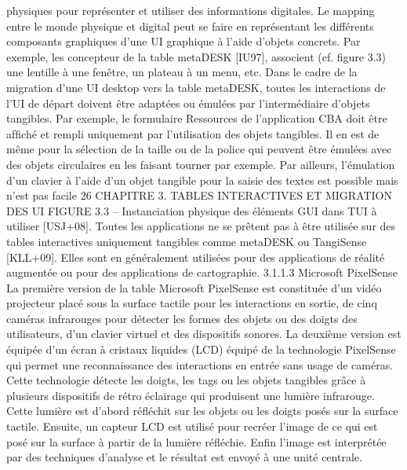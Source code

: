 \documentclass{article}
\begin{document}
physiques pour repr\'{e}senter et utiliser des informations digitales. Le mapping entre le monde physique
et digital peut se faire en repr\'{e}sentant les diff\'{e}rents composants graphiques d’une UI graphique \`{a}
l’aide d’objets concrets. Par exemple, les concepteur de la table metaDESK [IU97], associent (cf.
ﬁgure 3.3) une lentille \`{a} une fen\^{e}tre, un plateau \`{a} un menu, etc.
Dans le cadre de la migration d’une UI desktop vers la table metaDESK, toutes les interactions de
l’UI de d\'{e}part doivent \^{e}tre adapt\'{e}es ou \'{e}mul\'{e}es par l’interm\'{e}diaire d’objets tangibles. Par exemple,
le formulaire Ressources de l’application CBA doit \^{e}tre afﬁch\'{e} et rempli uniquement par l’utilisation des objets tangibles. Il en est de m\^{e}me pour la s\'{e}lection de la taille ou de la police qui peuvent
\^{e}tre \'{e}mul\'{e}es avec des objets circulaires en les faisant tourner par exemple. Par ailleurs, l’\'{e}mulation
d’un clavier \`{a} l’aide d’un objet tangible pour la saisie des textes est possible mais n’est pas facile
26
CHAPITRE 3. TABLES INTERACTIVES ET MIGRATION DES UI
FIGURE 3.3 – Instanciation physique des \'{e}l\'{e}ments GUI dans TUI
\`{a} utiliser [USJ+08]. Toutes les applications ne se pr\^{e}tent pas \`{a} \^{e}tre utilis\'{e}e sur des tables interactives uniquement tangibles comme metaDESK ou TangiSense [KLL+09]. Elles sont en g\'{e}n\'{e}ralement
utilis\'{e}es pour des applications de r\'{e}alit\'{e} augment\'{e}e ou pour des applications de cartographie.
3.1.1.3
Microsoft PixelSense
La premi\`{e}re version de la table Microsoft PixelSense est constitu\'{e}e d’un vid\'{e}o projecteur plac\'{e}
sous la surface tactile pour les interactions en sortie, de cinq cam\'{e}ras infrarouges pour d\'{e}tecter les
formes des objets ou des doigts des utilisateurs, d’un clavier virtuel et des dispositifs sonores. La
deuxi\`{e}me version est \'{e}quip\'{e}e d’un \'{e}cran \`{a} cristaux liquides (LCD) \'{e}quip\'{e} de la technologie PixelSense qui permet une reconnaissance des interactions en entr\'{e}e sans usage de cam\'{e}ras. Cette technologie d\'{e}tecte les doigts, les tags ou les objets tangibles gr\^{a}ce \`{a} plusieurs dispositifs de r\'{e}tro \'{e}clairage
qui produisent une lumi\`{e}re infrarouge. Cette lumi\`{e}re est d’abord r\'{e}ﬂ\'{e}chit sur les objets ou les doigts
pos\'{e}s sur la surface tactile. Ensuite, un capteur LCD est utilis\'{e} pour recr\'{e}er l’image de ce qui est
pos\'{e} sur la surface \`{a} partir de la lumi\`{e}re r\'{e}ﬂ\'{e}chie. Enﬁn l’image est interpr\'{e}t\'{e}e par des techniques
d’analyse et le r\'{e}sultat est envoy\'{e} \`{a} une unit\'{e} centrale.
\end{document}

